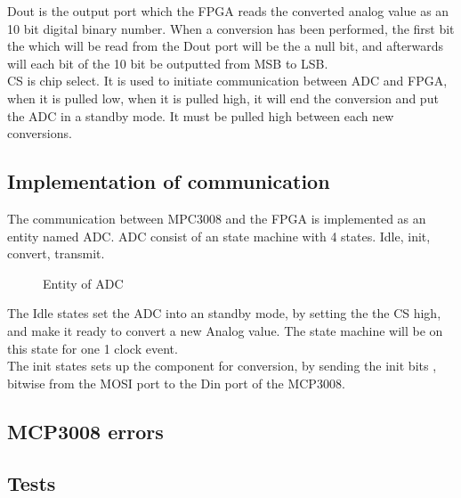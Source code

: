Dout is the output port which the FPGA reads the converted analog value as an 10 bit digital binary number. When a conversion has been performed,  the first bit the which will be read from the Dout port will be the a null bit, and afterwards will each bit of the 10 bit be outputted from MSB to LSB. \\


CS is chip select. It is used to initiate communication between ADC and FPGA, when it is pulled low, when it is pulled high, it will end the conversion and put the ADC in a standby mode.  It must be pulled high between each new conversions. 
 

\subsection{Implementation of communication}

The communication between MPC3008 and the FPGA is implemented as an entity named ADC. ADC consist of an state machine with 4 states. 
Idle, init, convert, transmit. \\
 
 


\begin{figure}[htb]
\centering
{}
\caption{Entity of ADC}
\end{figure}
 
The Idle states set the ADC into an standby mode, by setting the the CS high, and make it ready to convert a new Analog value.  The state machine will be on this state for one 1 clock event. \\

The init states sets up the component for conversion, by sending the init bits , bitwise from the MOSI port to the Din port of the MCP3008. 

\subsection{MCP3008 errors}
\subsection{Tests}